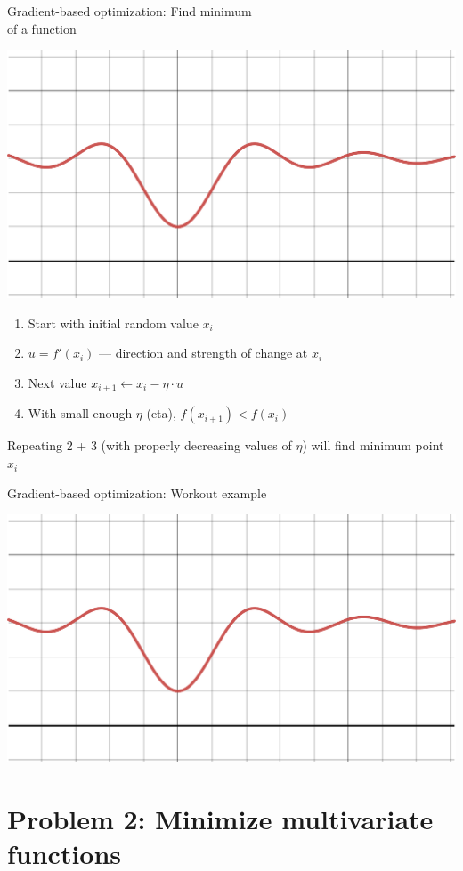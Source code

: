 \documentclass[12pt,aspectratio=169,handout]{beamer}
\begin{document}
\begin{frame}{Gradient-based optimization: Find minimum\\ of a function}
	
	\includegraphics[width=0.4\linewidth]{img/desmos-graph1.pdf}
	
	
	\begin{enumerate}
		\item Start with initial random value $x_i$
		\item $u = f'(x_i)$ --- direction and strength of change at $x_i$
		\item Next value $x_{i + 1} \gets x_i - \eta \cdot u$
		\item With small enough $\eta$ (eta), $f(x_{i+1}) < f(x_i)$
	\end{enumerate}
	Repeating 2 + 3 (with properly decreasing values of $\eta$) will find minimum point $x_i$
	
	
	
\end{frame}


\begin{frame}{Gradient-based optimization: Workout example}
	
	\includegraphics[width=0.99\linewidth]{img/desmos-graph1.pdf}
	
	
\end{frame}


\section{Problem 2: Minimize multivariate functions}
\end{document}
